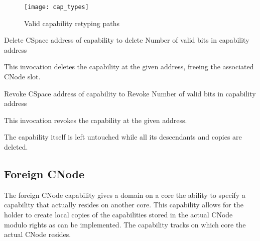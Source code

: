 \begin{figure}
  \centering
  \texttt{[image: cap\_types]}
  \caption{Valid capability retyping paths}\label{fig:cap_types}
\end{figure}
  
\begin{invocation}{Delete}
  \arg CSpace address of capability to delete
  \arg Number of valid bits in capability address
\end{invocation}
This invocation deletes the capability at the given address, freeing
the associated CNode slot.

\begin{invocation}{Revoke}
  \arg CSpace address of capability to Revoke
  \arg Number of valid bits in capability address
\end{invocation}
This invocation revokes the capability at the given address.

The capability itself is left untouched while all its descendants and
copies are deleted.

\subsection{Foreign CNode}

The foreign CNode capability gives a domain on a core the ability to
specify a capability that actually resides on another core.  This
capability allows for the holder to create local copies of the
capabilities stored in the actual CNode modulo rights as can be
implemented.  The capability tracks on which core the actual CNode
resides.  

